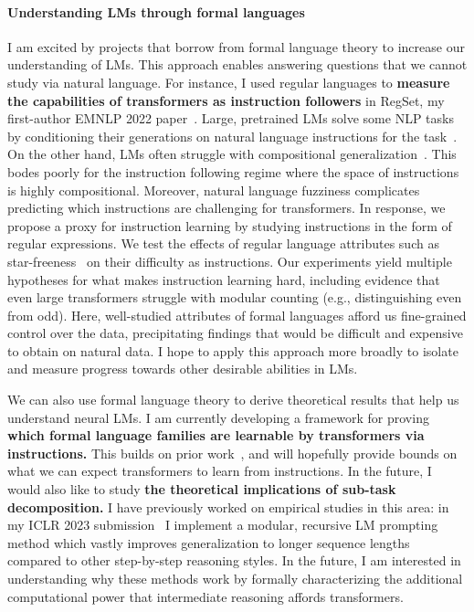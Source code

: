 \documentclass[11pt]{article}
\begin{document}
\paragraph{Understanding LMs through formal languages}

I am excited by projects 
that borrow from formal language theory
to increase our understanding of LMs.
This approach enables answering 
questions that we cannot study via natural language.
For instance, I used regular languages to 
\textbf{measure the capabilities of transformers as instruction followers}
in RegSet, my first-author EMNLP 2022 paper~\cite{Finlayson2022WhatMI}. 
Large, pretrained LMs solve some NLP tasks 
by conditioning their generations on natural language instructions 
for the task~\cite{mishra2021crosstask, Wei2021FinetunedLM}. 
On the other hand, LMs often struggle with
compositional generalization~\cite{Lake2018GeneralizationWS}. 
This bodes poorly for the instruction following regime
where the space of instructions is highly compositional.
Moreover, natural language fuzziness complicates predicting
which instructions are challenging for transformers.
In response, we propose a proxy for instruction learning
by studying instructions in the form of regular expressions.
We test the effects of regular language attributes
such as star-freeness~\cite{Salomaa1981JewelsOF}
on their difficulty as instructions.
Our experiments yield multiple hypotheses 
for what makes instruction learning hard, 
including evidence that even large transformers 
struggle with modular counting 
(e.g., distinguishing even from odd). 
Here, well-studied attributes of formal languages afford us 
fine-grained control over the data, 
precipitating findings that would be difficult and expensive 
to obtain on natural data.
I hope to apply this approach more broadly 
to isolate and measure progress towards other desirable abilities in LMs. 

We can also use formal language theory to derive theoretical results 
that help us understand neural LMs. 
I am currently developing a framework for 
proving \textbf{which formal language families 
are learnable by transformers via instructions.}
This builds on prior work~\cite{Merrill2022LogPrecisionTA},
and will hopefully provide bounds 
on what we can expect transformers to learn from instructions.
In the future, I would also like to study
\textbf{the theoretical implications of sub-task decomposition.}
I have previously worked on empirical studies in this area:
in my ICLR 2023 submission~\cite{Khot2022DecomposedPA}
I implement a modular, recursive LM prompting method
which vastly improves generalization to longer sequence lengths 
compared to other step-by-step reasoning styles.
In the future, I am interested in understanding why these methods work 
by formally characterizing the additional computational power 
that intermediate reasoning affords transformers.
\end{document}
